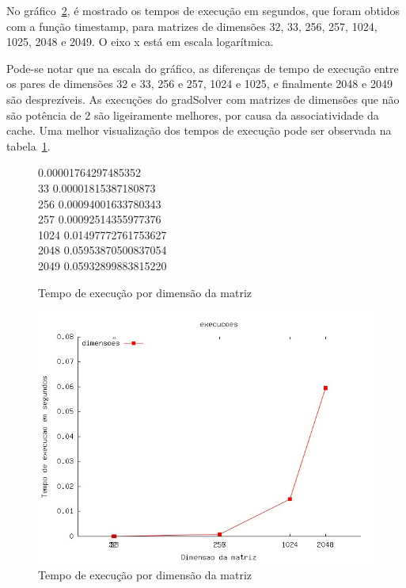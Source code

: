 \documentclass[12pt]{article}
\begin{document}
No gráfico~\ref{fig:execucao}, é mostrado os tempos de execução em segundos, que
foram obtidos com a função timestamp, para matrizes de dimensões 32, 33, 256,
257, 1024, 1025, 2048 e 2049. O eixo x está em escala logarítmica.

Pode-se notar que na escala do gráfico, as diferenças de tempo de execução entre
os pares de dimensões 32 e 33, 256 e 257, 1024 e 1025, e finalmente 2048 e 2049
são desprezíveis. As execuções do gradSolver com matrizes de dimensões que não
são potência de 2 são ligeiramente melhores, por causa da associatividade da
cache. Uma melhor visualização dos tempos de execução pode ser observada na
tabela~\ref{fig:tabelaExecucoes}.

\begin{figure}[htb]
\begin{tt}      0.00001764297485352\\
    33      0.00001815387180873\\
    256     0.00094001633780343\\
    257     0.00092514355977376\\
    1024    0.01497772761753627\\
    2048    0.05953870500837054\\
    2049    0.05932899883815220\\
\end{tt}\caption{Tempo de execução por dimensão da matriz}\label{fig:tabelaExecucoes}
\end{figure}

\begin{figure}[htb] \begin{center}
\includegraphics[width=150mm]{execucoes.jpg} \end{center}
\caption{Tempo de execução por dimensão da matriz}\label{fig:execucao}
\end{figure}
\end{document}
